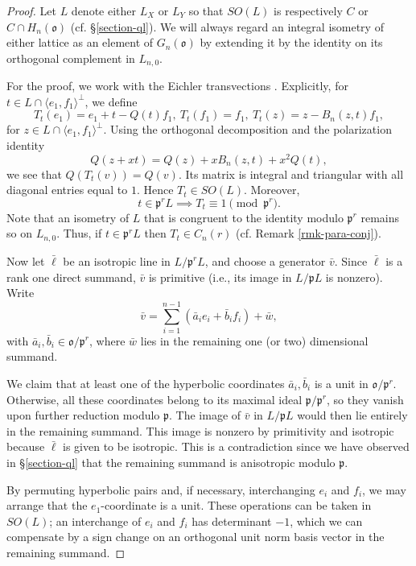 \documentclass[12pt]{amsart}
\theoremstyle{definition}
\theoremstyle{remark}
\begin{document}
\begin{proof}
Let $L$ denote either $L_X$ or $L_Y$ so that $SO(L)$ is respectively $C$ or $C \cap H_n(\mathfrak o)$ (cf. \S \ref{section-ql}).
We will always regard an integral isometry of either lattice as an element of $G_n(\mathfrak o)$ by extending it by the identity on its orthogonal complement in $L_{n,0}$. 

For the proof, we work with the Eichler transvections \cite[\S 3.1]{ghs09}. Explicitly, for $t\in L\cap\langle e_1,f_1\rangle^\perp$, we define
\[
T_t(e_1)=e_1+t-Q(t)f_1,~
T_t(f_1)=f_1,~
T_t(z)=z-B_n(z,t)f_1,\]
for $z\in L\cap\langle e_1,f_1\rangle^\perp$. 
Using the orthogonal decomposition and the polarization identity
\[
Q(z+xt)=Q(z)+xB_n(z,t)+x^2Q(t),
\]
we see that $Q(T_t(v))=Q(v)$.
Its matrix is integral and triangular with all diagonal entries equal to $1$. Hence $T_t\in SO(L)$.
Moreover,
\[
t\in\mathfrak p^rL
\implies 
T_t\equiv1\pmod{\mathfrak p^r}.
\]
Note that an isometry of $L$ that is congruent to the identity modulo $\mathfrak p^r$ remains so on $L_{n,0}$. Thus, if $t\in\mathfrak p^rL$ then $T_t \in C_n(r)$ (cf. Remark \ref{rmk-para-conj}).

Now let $\bar\ell$ be an isotropic line in $L/\mathfrak p^rL$, and choose a generator $\bar v$. Since $\bar\ell$ is a rank one direct summand, $\bar v$ is primitive (i.e., its image in $L/\mathfrak pL$ is nonzero). Write
\[
\bar v=\sum_{i=1}^{n-1}
(\bar a_i e_i+\bar b_i f_i)+\bar w,
\]
with $\bar a_i,\bar b_i\in\mathfrak o/\mathfrak p^r$, 
where $\bar w$ lies in the remaining one (or two) dimensional summand.

We claim that at least one of the hyperbolic coordinates $\bar a_i,\bar b_i$ is a unit in $\mathfrak o/\mathfrak p^r$. Otherwise, all these coordinates belong to its maximal ideal $\mathfrak p/\mathfrak p^r$, so they vanish upon further reduction modulo $\mathfrak p$. The image of $\bar v$ in $L/\mathfrak pL$ would then lie entirely in the remaining summand. This image is nonzero by primitivity and isotropic because $\bar\ell$  is given to be isotropic. This is a contradiction since we have observed in \S \ref{section-ql} that the remaining summand is anisotropic modulo $\mathfrak p$. 

By permuting hyperbolic pairs and, if necessary, interchanging $e_i$ and $f_i$, we may arrange that the $e_1$-coordinate is a unit. These operations can be taken in $SO(L)$; an interchange of $e_i$ and $f_i$ has determinant $-1$, which we can compensate by a sign change on an orthogonal unit norm basis vector in the remaining summand.


\end{proof}
\end{document}
